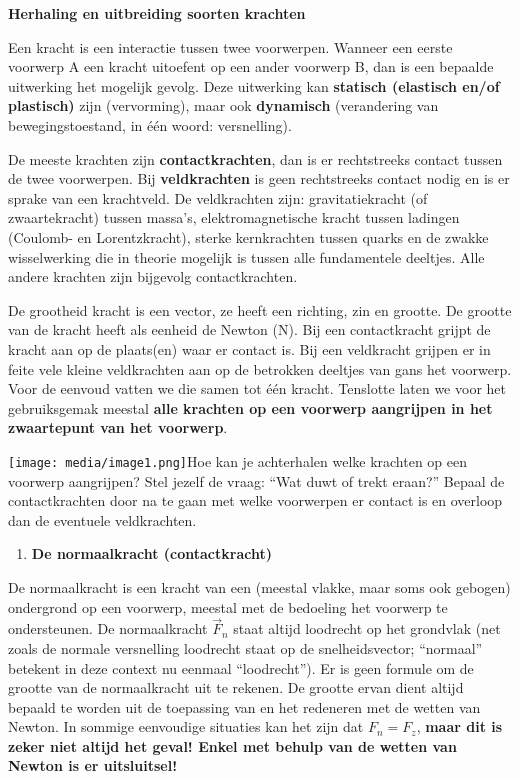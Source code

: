 \documentclass{ximera}
\newcommand{\ul}[1]{#1}
\begin{document}
	\author{Bart Lambregs}
    \xmsource\xmuitleg

\textbf{\ul{Herhaling en uitbreiding soorten krachten}}

Een kracht is een interactie tussen twee voorwerpen. Wanneer een eerste
voorwerp A een kracht uitoefent op een ander voorwerp B, dan is een
bepaalde uitwerking het mogelijk gevolg. Deze uitwerking kan
\textbf{statisch (elastisch en/of plastisch)} zijn (vervorming), maar
ook \textbf{dynamisch} (verandering van bewegingstoestand, in één woord:
versnelling).

De meeste krachten zijn \textbf{contactkrachten}, dan is er rechtstreeks
contact tussen de twee voorwerpen. Bij \textbf{veldkrachten} is geen
rechtstreeks contact nodig en is er sprake van een krachtveld. De
veldkrachten zijn: gravitatiekracht (of zwaartekracht) tussen massa's,
elektromagnetische kracht tussen ladingen (Coulomb- en Lorentzkracht),
sterke kernkrachten tussen quarks en de zwakke wisselwerking die in
theorie mogelijk is tussen alle fundamentele deeltjes. Alle andere
krachten zijn bijgevolg contactkrachten.

De grootheid kracht is een vector, ze heeft een richting, zin en
grootte. De grootte van de kracht heeft als eenheid de Newton (N). Bij
een contactkracht grijpt de kracht aan op de plaats(en) waar er contact
is. Bij een veldkracht grijpen er in feite vele kleine veldkrachten aan
op de betrokken deeltjes van gans het voorwerp. Voor de eenvoud vatten
we die samen tot één kracht. Tenslotte laten we voor het gebruiksgemak
meestal \textbf{alle krachten op een voorwerp aangrijpen in het
zwaartepunt van het voorwerp}.

\texttt{[image: media/image1.png]}Hoe
kan je achterhalen welke krachten op een voorwerp aangrijpen? Stel
jezelf de vraag: ``Wat duwt of trekt eraan?'' Bepaal de contactkrachten
door na te gaan met welke voorwerpen er contact is en overloop dan de
eventuele veldkrachten.

\begin{enumerate}
\def\labelenumi{\arabic{enumi}.}
\item
  \textbf{De normaalkracht (contactkracht)}
\end{enumerate}

De normaalkracht is een kracht van een (meestal vlakke, maar soms ook
gebogen) ondergrond op een voorwerp, meestal met de bedoeling het
voorwerp te ondersteunen. De normaalkracht \({\overrightarrow{F}}_{n}\)
staat altijd loodrecht op het grondvlak (net zoals de normale
versnelling loodrecht staat op de snelheidsvector; ``normaal'' betekent
in deze context nu eenmaal ``loodrecht''). Er is geen formule om de
grootte van de normaalkracht uit te rekenen. De grootte ervan dient
altijd bepaald te worden uit de toepassing van en het redeneren met de
wetten van Newton. In sommige eenvoudige situaties kan het zijn dat
\(F_{n} = F_{z}\), \textbf{maar dit is zeker niet altijd het geval!
Enkel met behulp van de wetten van Newton is er uitsluitsel!}
\end{document}
